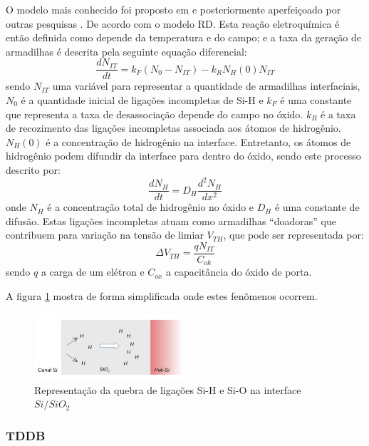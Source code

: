 O modelo mais conhecido foi proposto em \cite{Alam2003} e posteriormente aperfeiçoado por outras pesquisas \cite{Schroder2003}\cite{Chakravarthi2004}. De acordo com o modelo RD. Esta reação eletroquímica é então definida como depende da temperatura e do campo; e a taxa da geração de armadilhas é descrita pela seguinte equação diferencial:
\begin{equation}\label{eq:BTI_RD_diff}
\frac{d N_{IT}}{dt} = k_F\left(N_0 - N_{IT}\right) - k_RN_H(0)N_{IT}
\end{equation}
sendo $N_{IT}$ uma variável para representar a quantidade de armadilhas interfaciais, $N_0$ é a quantidade inicial de ligações incompletas de Si-H e $k_F$ é uma constante que representa a taxa de desassociação depende do campo no óxido. $k_R$ é a taxa de recozimento das ligações incompletas associada aos átomos de hidrogênio. $N_H(0)$ é a concentração de hidrogênio na interface. Entretanto, os átomos de hidrogênio podem difundir da interface para dentro do óxido, sendo este processo descrito por:
\begin{equation}\label{eq:BTI_RD_hydrogen_diff}
\frac{d N_{H}}{dt} = D_H\frac{d^2N_H}{dx^2}
\end{equation}
onde $N_H$ é a concentração total de hidrogênio no óxido e $D_H$ é uma constante de difusão. Estas ligações incompletas atuam como armadilhas ``doadoras'' que contribuem para variação na tensão de limiar $V_{TH}$, que pode ser representada por:
\begin{equation}
\Delta V_{TH}=\frac{qN_{IT}}{C_{ok}}
\end{equation}
sendo $q$ a carga de um elétron e $C_{ox}$ a capacitância do óxido de porta.

A figura \ref{figure:RD_model} mostra de forma simplificada onde estes fenômenos ocorrem.
\begin{figure}
\center
\includegraphics[width=0.5\textwidth]{images/RD_model}
\caption{Representação da quebra de ligações Si-H e Si-O na interface $Si/SiO_2$}
\label{figure:RD_model}
\end{figure}
\subsubsection{TDDB}
\label{subsubsection_Modelos_TDDB}

